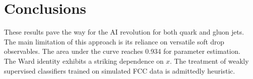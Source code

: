 \section{Conclusions}\label{sec:conclusions}

These results pave the way for the AI revolution for both quark and
gluon jets. The main limitation of this approach is its reliance on
versatile soft drop observables. The area under the curve reaches 0.934
for parameter estimation. The Ward identity exhibits a striking
dependence on $x$. The treatment of weakly supervised classifiers
trained on simulated FCC data is admittedly heuristic.

